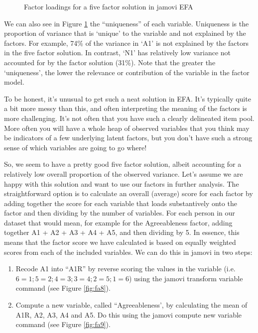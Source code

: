 \begin{figure}[!htb]
\begin{center}
\caption{Factor loadings for a five factor solution in jamovi EFA}
\label{fig:fa7}
\HR
\end{center}
\end{figure}

We can also see in Figure \ref{fig:fa7} the “uniqueness” of each variable. Uniqueness is the proportion of variance that is ‘unique’ to the variable and not explained by the factors. For example, 74\% of the variance in ‘A1’ is not explained by the factors in the five factor solution. In contrast, ‘N1’ has relatively low variance not accounted for by the factor solution (31\%). Note that the greater the ‘uniqueness’, the lower the relevance or contribution of the variable in the factor model. 

To be honest, it’s unusual to get such a neat solution in EFA. It’s typically quite a bit more messy than this, and often interpreting the meaning of the factors is more challenging. It’s not often that you have such a clearly delineated item pool. More often you will have a whole heap of observed variables that you think may be indicators of a few underlying latent factors, but you don’t have such a strong sense of which variables are going to go where!

So, we seem to have a pretty good five factor solution, albeit accounting for a relatively low overall proportion of the observed variance. Let’s assume we are happy with this solution and want to use our factors in further analysis. The straightforward option is to calculate an overall (average) score for each factor by adding together the score for each variable that loads substantively onto the factor and then dividing by the number of variables. For each person in our dataset that would mean, for example for the Agreeableness factor, adding together A1 + A2 + A3 + A4 + A5, and then dividing by 5. In essence, this means that the factor score we have calculated is based on equally weighted scores from each of the included variables. We can do this in jamovi in two steps:

\begin{enumerate} \itemsep -2pt
\item Recode A1 into “A1R” by reverse scoring the values in the variable (i.e. $6=1; 5=2; 4=3; 3=4; 2=5; 1=6$) using the jamovi transform variable command (see Figure \ref{fig:fa8}).
\item Compute a new variable, called “Agreeableness’,  by calculating the mean of A1R, A2, A3, A4 and A5. Do this using the jamovi compute new variable command (see Figure \ref{fig:fa9}).
\end{enumerate}

